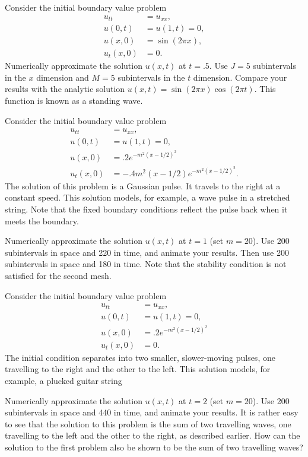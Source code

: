 \begin{problem}
Consider the initial boundary value problem
\begin{align*}
	u_{tt} &= u_{xx}, \\
	u(0,t) &= u(1,t) = 0, \\
	u(x,0) &= \sin(2 \pi x),\\
	u_t(x,0) &= 0.
\end{align*}
Numerically approximate the solution $u(x,t)$ at $t = .5$.
Use $J=5$ subintervals in the $x$ dimension and $M=5$ subintervals in the $t$ dimension.
Compare your results with the analytic solution $u(x,t) = \sin{(2 \pi x)} \cos{(2 \pi t)}$.
This function is known as a standing wave.
\end{problem}

\begin{problem}
Consider the initial boundary value problem
\begin{align*}
	u_{tt} &= u_{xx}, \\
	u(0,t) &= u(1,t) = 0, \\
	u(x,0) &= .2e^{-m^2(x-1/2)^2}\\
	u_t(x,0) &= -.4m^2(x-1/2)e^{-m^2(x-1/2)^2}.
\end{align*}
The solution of this problem is a Gaussian pulse.
It travels to the right at a constant speed.
This solution models, for example, a wave pulse in a stretched string.
Note that the fixed boundary conditions reflect the pulse back when it meets the boundary.

Numerically approximate the solution $u(x,t)$ at $t = 1$ (set $m=20$).
Use 200 subintervals in space and 220 in time, and animate your results.
Then use 200 subintervals in space and 180 in time.
Note that the stability condition is not satisfied for the second mesh.
\end{problem}

\begin{problem}
Consider the initial boundary value problem
\begin{align*}
	u_{tt} &= u_{xx}, \\
	u(0,t) &= u(1,t) = 0, \\
	u(x,0) &= .2e^{-m^2(x-1/2)^2}\\
	u_t(x,0) &= 0.
\end{align*}
The initial condition separates into two smaller, slower-moving pulses, one travelling to the right and the other to the left.
This solution models, for example, a plucked guitar string

Numerically approximate the solution $u(x,t)$ at $t = 2$ (set $m=20$).
Use 200 subintervals in space and 440 in time, and animate your results.
It is rather easy to see that the solution to this problem is the sum of two travelling waves, one travelling to the left and the other to the right, as described earlier.
How can the solution to the first problem also be shown to be the sum of two travelling waves?
\end{problem}

